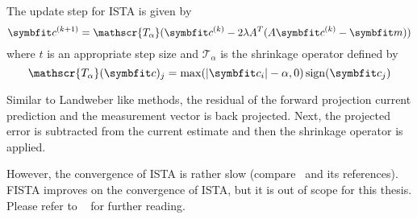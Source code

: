 \begin{definition}[ISTA]\label{def:ista}
	The update step for \gls{ISTA} is given by
	\[
		\mvec{c}^{(k+1)} = \mathscr{T_\alpha} (\mvec{c}^{(k)} - 2 \lambda A^T (A \mvec{c}^{(k)} - \mvec{m}))
	\]
	where \(t\) is an appropriate step size and \(\mathscr{T_\alpha}\) is the shrinkage operator
	defined by
	\[
		\mathscr{T_\alpha}(\mvec{c})_j = \max(\abs{\mvec{c}_i} - \alpha, 0) \sign(\mvec{c}_j)
	\]
\end{definition}
Similar to Landweber like methods, the residual of the forward projection current prediction and the
measurement vector is back projected. Next, the projected error is subtracted from the current
estimate and then the shrinkage operator is applied.

However, the convergence of \gls{ISTA} is rather slow (compare~\cite{beck_fast_2009} and its
references). \gls{FISTA} improves on the convergence of \gls{ISTA}, but it is out of scope for this
thesis. Please refer to \citeauthor{beck_fast_2009}~\cite{beck_fast_2009} for further reading.
